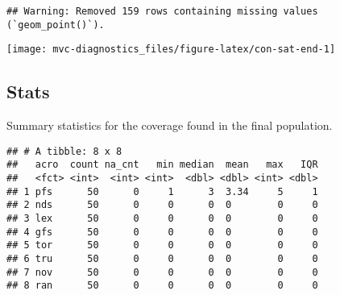 \documentclass[]{book}
\newenvironment{Shaded}{\begin{snugshade}}{\end{snugshade}}
\newcommand{\DataTypeTok}[1]{\textcolor[rgb]{0.13,0.29,0.53}{#1}}
\newcommand{\DecValTok}[1]{\textcolor[rgb]{0.00,0.00,0.81}{#1}}
\newcommand{\KeywordTok}[1]{\textcolor[rgb]{0.13,0.29,0.53}{\textbf{#1}}}
\newcommand{\NormalTok}[1]{#1}
\newcommand{\OperatorTok}[1]{\textcolor[rgb]{0.81,0.36,0.00}{\textbf{#1}}}
\newcommand{\OtherTok}[1]{\textcolor[rgb]{0.56,0.35,0.01}{#1}}
\newcommand{\StringTok}[1]{\textcolor[rgb]{0.31,0.60,0.02}{#1}}
\begin{document}
\begin{verbatim}
## Warning: Removed 159 rows containing missing values (`geom_point()`).
\end{verbatim}

\texttt{[image: mvc-diagnostics\_files/figure-latex/con-sat-end-1]}

\hypertarget{stats-5}{%
\subsection{Stats}\label{stats-5}}

Summary statistics for the coverage found in the final population.

\begin{Shaded}
\end{Shaded}

\begin{verbatim}
## # A tibble: 8 x 8
##   acro  count na_cnt   min median  mean   max   IQR
##   <fct> <int>  <int> <int>  <dbl> <dbl> <int> <dbl>
## 1 pfs      50      0     1      3  3.34     5     1
## 2 nds      50      0     0      0  0        0     0
## 3 lex      50      0     0      0  0        0     0
## 4 gfs      50      0     0      0  0        0     0
## 5 tor      50      0     0      0  0        0     0
## 6 tru      50      0     0      0  0        0     0
## 7 nov      50      0     0      0  0        0     0
## 8 ran      50      0     0      0  0        0     0
\end{verbatim}
\end{document}

